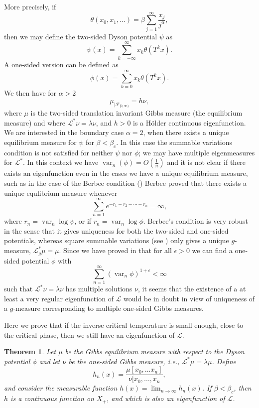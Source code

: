 \documentclass[11pt, a4paper, oneside]{scrartcl}
\newtheorem{thm}{Theorem}
\theoremstyle{definition}
\theoremstyle{remark}
\providecommand{\opn}{\operatorname}
\providecommand{\var}{\opn{var}}
\begin{document}
More precisely, if
$$\theta(x_0, x_1,\ldots)=\beta \sum_{j=1}^\infty \frac{x_j}{j^\alpha},$$
then we may define the two-sided Dyson potential $\psi$ as
$$\psi(x)=\sum_{k=-\infty}^\infty x_k \theta(T^k x).$$ 
A one-sided version can be defined as
$$\phi(x)=\sum_{k=0}^\infty x_k \theta (T^k x).$$
We then have for $\alpha>2$
$$\mu_{|{\mathcal F}_{[0,\infty)}}= h\nu,$$
where $\mu$ is the two-sided translation invariant Gibbs measure (the
equilibrium measure) and where ${\mathcal L}^*\nu=\lambda \nu$, and $h>0$ is a
H\"older continuous eigenfunction. We are interested in the boundary case
$\alpha=2$, when there exists a unique equilibrium measure for $\psi$ for
$\beta<\beta_c$. In this case the summable variations condition is not satisfied
for neither $\psi$ nor $\phi$; we may have multiple eigenmeasures for
${\mathcal L}^*$. In this context we have $\var_n(\phi)=O(\frac{1}{n})$ and it
is not clear if there exists an eigenfunction even in the cases we have a unique
equilibrium measure, such as in the case of the Berbee condition
(\cite{berbeeUniquenessGibbsMeasures1989}) Berbee proved that there exists a
unique equlibrium measure whenever
\begin{equation}\label{berbee}
  \sum_{n=1}^\infty e^{-r_1-r_2-\cdots-r_n}=\infty,    
\end{equation}
where $r_n=\var_n \log \psi$, or if $r_n=\var_n \log \phi$. Berbee's condition
is very robust in the sense that it gives uniqueness for both the two-sided and
one-sided potentials, whereas square summable variations (see
\cite{johanssonSquareSummabilityVariations2003}) only gives a unique
$g$-measure, ${\mathcal L}_g^* \mu=\mu$. Since we have proved in
\cite{johanssonPhaseTransitionsLongrange2017}
that for all $\epsilon>0$ we can find a one-sided potential $\phi$ with
$$\sum_{n=1}^\infty (\var_n \phi)^{1+\epsilon}<\infty$$
such that ${\mathcal L}^* \nu=\lambda \nu$ has multiple solutions $\nu$, it
seems that the existence of a at least a very regular eigenfunction of
${\mathcal L}$ would be in doubt in view of uniqueness of a $g$-measure
corresponding to multiple one-sided Gibbs measures.

Here we prove that if the inverse critical temperature is small enough, close to
the critical phase, then we still have an eigenfunction of ${\mathcal L}$.

\begin{thm}\label{main} Let $\mu$ be the Gibbs equilibrium measure with respect
to the Dyson potential $\phi$ and let $\nu$ be the one-sided Gibbs measure,
i.e., ${\mathcal L}^*\mu=\lambda \mu$. Define
$$h_n(x)=\frac{\mu[x_0,\ldots x_n]}{\nu[x_0,\ldots, x_n},$$
and consider the measurable function $h(x)=\lim_{n\to \infty}h_n(x)$. If
$\beta<\beta_c$, then $h$ is a continuous function on $X_+$, and which is also
an eigenfunction of ${\mathcal L}$.
\end{thm}
\end{document}
